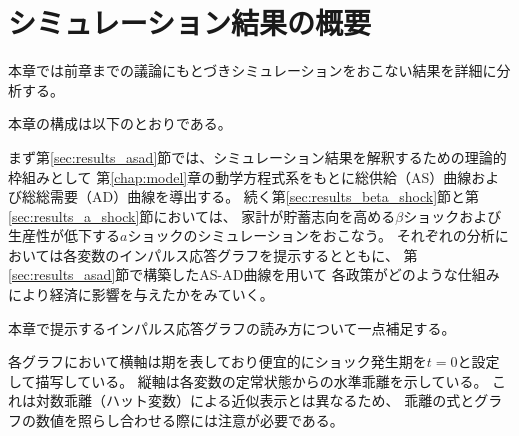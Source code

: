 
\section{シミュレーション結果の概要}
\label{sec:results_overview}

本章では前章までの議論にもとづきシミュレーションをおこない結果を詳細に分析する。

本章の構成は以下のとおりである。

まず第\ref{sec:results_asad}節では、シミュレーション結果を解釈するための理論的枠組みとして
第\ref{chap:model}章の動学方程式系をもとに総供給（AS）曲線および総総需要（AD）曲線を導出する。
続く第\ref{sec:results_beta_shock}節と第\ref{sec:results_a_shock}節においては、
家計が貯蓄志向を高める\(\beta\)ショックおよび
生産性が低下する\(a\)ショックのシミュレーションをおこなう。
それぞれの分析においては各変数のインパルス応答グラフを提示するとともに、
第\ref{sec:results_asad}節で構築したAS-AD曲線を用いて
各政策がどのような仕組みにより経済に影響を与えたかをみていく。

本章で提示するインパルス応答グラフの読み方について一点補足する。

各グラフにおいて横軸は期を表しており便宜的にショック発生期を\(t=0\)と設定して描写している。
縦軸は各変数の定常状態からの水準乖離を示している。
これは対数乖離（ハット変数）による近似表示とは異なるため、
乖離の式とグラフの数値を照らし合わせる際には注意が必要である。